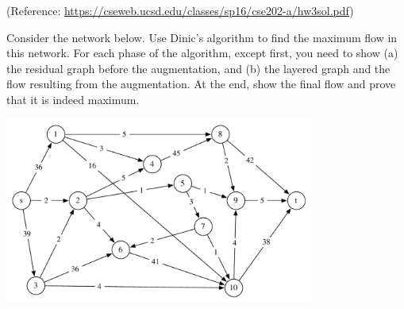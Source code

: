 \documentclass[11pt]{article}
\begin{document}
(Reference: \url{https://cseweb.ucsd.edu/classes/sp16/cse202-a/hw3sol.pdf})



\begin{problem} 
Consider the network below. Use Dinic's algorithm to find the maximum flow in this network. For each phase of the algorithm, except first, you need to show (a) the residual graph before the augmentation, and (b) the layered graph and the flow resulting from the augmentation. At the end, show the final flow and prove that it is indeed maximum.

\noindent
\begin{center}
\includegraphics[width=4in]{hw3_dinic.pdf} %
\end{center}
\end{problem}


\vskip 0.2in
\section{}
\end{document}
